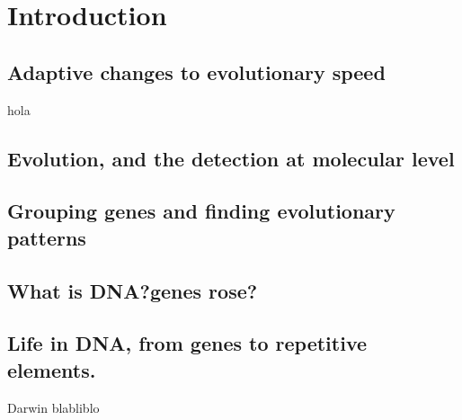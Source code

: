 

\part{Introduction}
\label{intro}
\tableofcontents

\chapter{Adaptive changes to evolutionary speed}

hola

\chapter{Evolution, and the detection at molecular level}

\chapter{Grouping genes and finding evolutionary patterns}

\chapter{What is DNA?\@How genes rose?}

\chapter{Life in DNA, from genes to repetitive elements.}

Darwin blabliblo

\cite{Serra2011}
